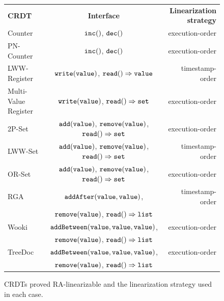 \begin{figure}[t]
{\footnotesize
\begin{tabular}{|l|c|r|}
\hline
{\bf CRDT} & {\bf Interface} & {\bf Linearization strategy}\\
\hhline{|===|}
Counter~\cite{ShapiroPBZ11}&$\alabelshort[{\tt inc}]{}$, $\alabelshort[{\tt dec}]{}$ & execution-order \\
\hline
PN-Counter~\cite{ShapiroPBZ11}&$\alabelshort[{\tt inc}]{}$, $\alabelshort[{\tt dec}]{}$ & execution-order \\
\hline
LWW-Register~\cite{DBLP:journals/rfc/rfc677}&$\alabelshort[{\tt write}]{value}$, $\alabellong[{\tt read}]{}{value}{}$ & timestamp-order\\
\hline
Multi-Value Register~\cite{DBLP:conf/sosp/DeCandiaHJKLPSVV07}&$\alabelshort[{\tt write}]{value}$, $\alabellong[{\tt read}]{}{set}{}$ & execution-order\\
\hline
2P-Set~\cite{ShapiroPBZ11}&$\alabelshort[{\tt add}]{value}$, $\alabelshort[{\tt remove}]{value}$, $\alabellong[{\tt read}]{}{set}{}$ & execution-order\\
\hline
LWW-Set~\cite{ShapiroPBZ11}&$\alabelshort[{\tt add}]{value}$, $\alabelshort[{\tt remove}]{value}$, $\alabellong[{\tt read}]{}{set}{}$ & timestamp-order\\
\hline
OR-Set~\cite{ShapiroPBZ11}&$\alabelshort[{\tt add}]{value}$, $\alabelshort[{\tt remove}]{value}$, $\alabellong[{\tt read}]{}{set}{}$ & execution-order\\
\hline
RGA~\cite{RohJKL11}&$\alabelshort[{\tt addAfter}]{value,value}$, & timestamp-order
                \\ & $\alabelshort[{\tt remove}]{value}$, $\alabellong[{\tt read}]{}{list}{}$ & \\
\hline
Wooki~\cite{DBLP:conf/wise/WeissUM07}&$\alabelshort[{\tt addBetween}]{value,value,value}$, & execution-order
                \\ & $\alabelshort[{\tt remove}]{value}$, $\alabellong[{\tt read}]{}{list}{}$ & \\
\hline
TreeDoc~\cite{DBLP:conf/icdcs/PreguicaMSL09}&$\alabelshort[{\tt addBetween}]{value,value,value}$, & execution-order
                \\ & $\alabelshort[{\tt remove}]{value}$, $\alabellong[{\tt read}]{}{list}{}$ & \\
\hline
\end{tabular}
}
\caption{CRDTs proved RA-linearizable and the linearization strategy used in each case.}
\label{fig:crdt-implementaton of this paper, their correctness, and their interface}
\end{figure}

